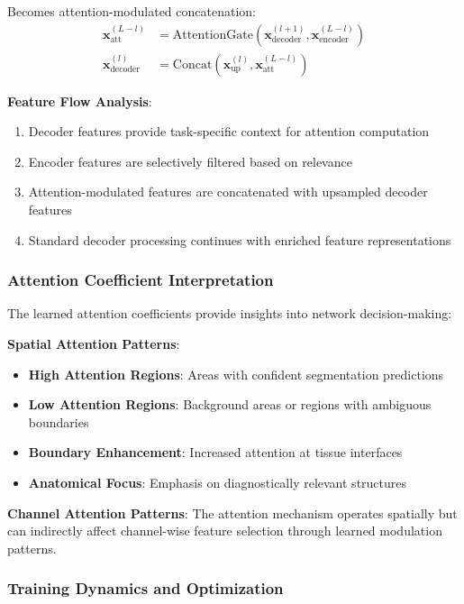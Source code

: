 \documentclass[12pt,a4paper]{article}
\begin{document}
Becomes attention-modulated concatenation:
\begin{align}
\mathbf{x}^{(L-l)}_{\text{att}} &= \text{AttentionGate}(\mathbf{x}^{(l+1)}_{\text{decoder}}, \mathbf{x}^{(L-l)}_{\text{encoder}}) \\
\mathbf{x}^{(l)}_{\text{decoder}} &= \text{Concat}(\mathbf{x}^{(l)}_{\text{up}}, \mathbf{x}^{(L-l)}_{\text{att}})
\end{align}

\textbf{Feature Flow Analysis}:
\begin{enumerate}
    \item Decoder features provide task-specific context for attention computation
    \item Encoder features are selectively filtered based on relevance
    \item Attention-modulated features are concatenated with upsampled decoder features
    \item Standard decoder processing continues with enriched feature representations
\end{enumerate}

\subsubsection{Attention Coefficient Interpretation}

The learned attention coefficients provide insights into network decision-making:

\textbf{Spatial Attention Patterns}:
\begin{itemize}
    \item \textbf{High Attention Regions}: Areas with confident segmentation predictions
    \item \textbf{Low Attention Regions}: Background areas or regions with ambiguous boundaries
    \item \textbf{Boundary Enhancement}: Increased attention at tissue interfaces
    \item \textbf{Anatomical Focus}: Emphasis on diagnostically relevant structures
\end{itemize}

\textbf{Channel Attention Patterns}:
The attention mechanism operates spatially but can indirectly affect channel-wise feature selection through learned modulation patterns.

\subsubsection{Training Dynamics and Optimization}
\end{document}
